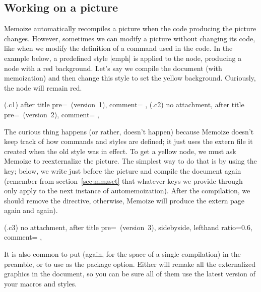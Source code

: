 \documentclass[a4paper,11pt]{article}
\begin{document}
\subsection{Working on a picture}
\label{sec:tut:working-on-a-picture}


Memoize automatically recompiles a picture when the code producing the picture
changes.  However, sometimes we can modify a picture without changing its code,
like when we modify the definition of a command used in the code.  In the
example below, a predefined style |emph| is applied to the node, producing a
node with a red background.  Let's say we compile the document (with
memoization) and then change this style to set the yellow background.
Curiously, the node will remain red.

\begin{tcbraster}[raster columns=2, raster valign=top, raster column skip=4mm]
  (.c1){
    after title pre={\ (version~1)},
    comment={\centering
    },
  }
  (.c2){
    no attachment,
    after title pre={\ (version~2)},
    comment={\centering
    },
  }
\end{tcbraster}

The curious thing happens (or rather, doesn't happen) because Memoize doesn't
keep track of how commands and styles are defined; it just uses the extern file
it created when the old style was in effect.  To get a yellow node, we must ask
Memoize to reexternalize the picture.  The simplest way to do that is by using
the  key; below, we write
 just before the picture and
compile the document again (remember from section~\ref{sec:mmzset} that
whatever keys we provide through  only apply to the next instance of
automemoization).  After the compilation, we should remove the
 directive, otherwise, Memoize will produce the extern page
again and again).

(.c3){
  no attachment,
  after title pre={\ (version~3)},
  sidebyside, lefthand ratio=0.6,
  comment={\centering
  },
}

It is also common to put (again, for the space of a single compilation)
 in the preamble, or to use
 as the package option.  Either will remake all the
externalized graphics in the document, so you can be sure all of them use the
latest version of your macros and styles.
\end{document}
